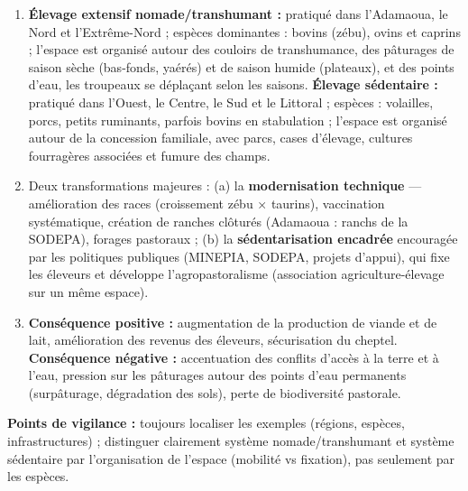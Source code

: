 \documentclass[11pt]{article}
\begin{document}
\begin{corrige}
\begin{enumerate}
\item \textbf{Élevage extensif nomade/transhumant :} pratiqué dans l'Adamaoua, le Nord et l'Extrême-Nord ; espèces dominantes : bovins (zébu), ovins et caprins ; l'espace est organisé autour des couloirs de transhumance, des pâturages de saison sèche (bas-fonds, yaérés) et de saison humide (plateaux), et des points d'eau, les troupeaux se déplaçant selon les saisons.
\textbf{Élevage sédentaire :} pratiqué dans l'Ouest, le Centre, le Sud et le Littoral ; espèces : volailles, porcs, petits ruminants, parfois bovins en stabulation ; l'espace est organisé autour de la concession familiale, avec parcs, cases d'élevage, cultures fourragères associées et fumure des champs.
\item Deux transformations majeures : (a) la \textbf{modernisation technique} — amélioration des races (croissement zébu × taurins), vaccination systématique, création de ranches clôturés (Adamaoua : ranchs de la SODEPA), forages pastoraux ; (b) la \textbf{sédentarisation encadrée} encouragée par les politiques publiques (MINEPIA, SODEPA, projets d'appui), qui fixe les éleveurs et développe l'agropastoralisme (association agriculture-élevage sur un même espace).
\item \textbf{Conséquence positive :} augmentation de la production de viande et de lait, amélioration des revenus des éleveurs, sécurisation du cheptel. \textbf{Conséquence négative :} accentuation des conflits d'accès à la terre et à l'eau, pression sur les pâturages autour des points d'eau permanents (surpâturage, dégradation des sols), perte de biodiversité pastorale.
\end{enumerate}
\textbf{Points de vigilance :} toujours localiser les exemples (régions, espèces, infrastructures) ; distinguer clairement système nomade/transhumant et système sédentaire par l'organisation de l'espace (mobilité vs fixation), pas seulement par les espèces.
\end{corrige}
\end{document}
